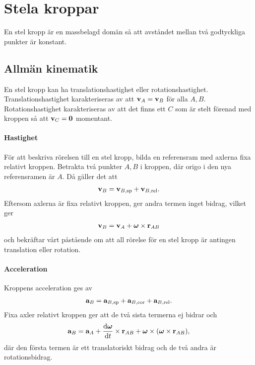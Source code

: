 \section{Stela kroppar}
En stel kropp är en massbelagd domän så att avståndet mellan två godtyckliga punkter är konstant.

\subsection{Allmän kinematik}
En stel kropp kan ha translationshastighet eller rotationshastighet. Translationshastighet karakteriseras av att $\vb{v}_{A} = \vb{v}_{B}$ för alla $A, B$. Rotationshastighet karakteriseras av att det finns ett $C$ som är stelt förenad med kroppen så att $\vb{v}_{C} = \vb{0}$ momentant. 

\paragraph{Hastighet}
För att beskriva rörelsen till en stel kropp, bilda en referensram med axlerna fixa relativt kroppen. Betrakta två punkter $A, B$ i kroppen, där origo i den nya referensramen är $A$. Då gäller det att
\begin{align*}
	\vb{v}_{B} = \vb{v}_{B, \text{sp}} + \vb{v}_{B, \text{rel}}.
\end{align*}
Eftersom axlerna är fixa relativt kroppen, ger andra termen inget bidrag, vilket ger
\begin{align*}
	\vb{v}_{B} = \vb{v}_{A} + \vb*{\omega}\times\vb{r}_{AB}
\end{align*}
och bekräftar vårt påstående om att all rörelse för en stel kropp är antingen translation eller rotation.

\paragraph{Acceleration}
Kroppens acceleration ges av
\begin{align*}
	\vb{a}_{B} = \vb{a}_{B, \text{sp}} + \vb{a}_{B, \text{cor}} + \vb{a}_{B, \text{rel}}.
\end{align*}
Fixa axler relativt kroppen ger att de två sista termerna ej bidrar och
\begin{align*}
	\vb{a}_{B} = \vb{a}_{A} + \dv{\vb*{\omega}}{t}\times\vb{r}_{AB} + \vb*{\omega}\times(\vb*{\omega}\times\vb{r}_{AB}),
\end{align*}
där den första termen är ett translatoriskt bidrag och de två andra är rotationsbidrag.

